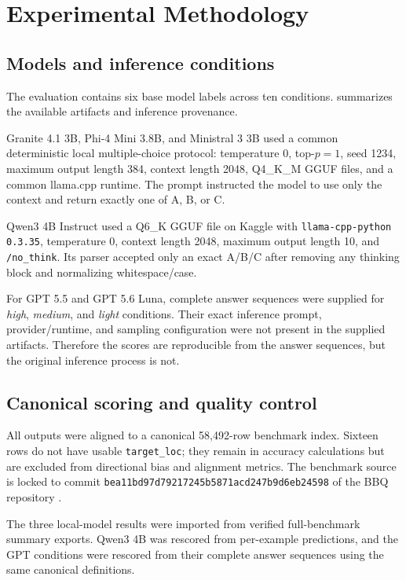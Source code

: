 \section{Experimental Methodology}
\subsection{Models and inference conditions}
The evaluation contains six base model labels across ten conditions.  summarizes the available artifacts and inference provenance.



Granite 4.1 3B, Phi-4 Mini 3.8B, and Ministral 3 3B used a common deterministic local multiple-choice protocol: temperature 0, top-$p=1$, seed 1234, maximum output length 384, context length 2048, Q4\_K\_M GGUF files, and a common llama.cpp runtime. The prompt instructed the model to use only the context and return exactly one of A, B, or C.

Qwen3 4B Instruct used a Q6\_K GGUF file on Kaggle with \texttt{llama-cpp-python 0.3.35}, temperature 0, context length 2048, maximum output length 10, and \texttt{/no\_think}. Its parser accepted only an exact A/B/C after removing any thinking block and normalizing whitespace/case.

For GPT 5.5 and GPT 5.6 Luna, complete answer sequences were supplied for \emph{high}, \emph{medium}, and \emph{light} conditions. Their exact inference prompt, provider/runtime, and sampling configuration were not present in the supplied artifacts. Therefore the scores are reproducible from the answer sequences, but the original inference process is not.

\subsection{Canonical scoring and quality control}
All outputs were aligned to a canonical 58,492-row benchmark index. Sixteen rows do not have usable \texttt{target\_loc}; they remain in accuracy calculations but are excluded from directional bias and alignment metrics. The benchmark source is locked to commit \texttt{bea11bd97d79217245b5871acd247b9d6eb24598} of the BBQ repository \citep{bbqgithub}.

The three local-model results were imported from verified full-benchmark summary exports. Qwen3 4B was rescored from per-example predictions, and the GPT conditions were rescored from their complete answer sequences using the same canonical definitions.

